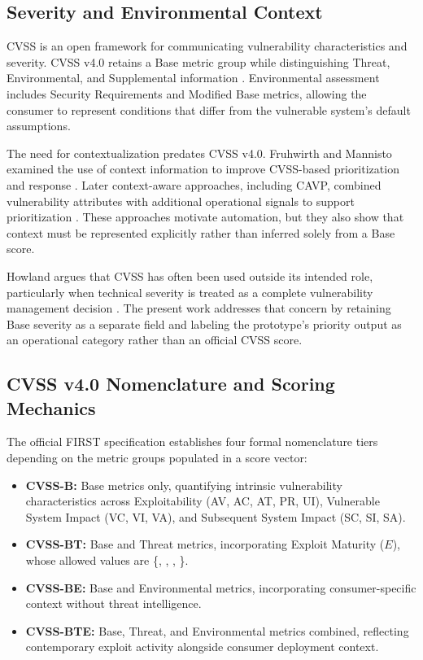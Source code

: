 \documentclass[conference]{IEEEtran}
\begin{document}
\subsection{Severity and Environmental Context}

CVSS is an open framework for communicating vulnerability characteristics and
severity. CVSS v4.0 retains a Base metric group while distinguishing Threat,
Environmental, and Supplemental information
\cite{first_spec,first_user_guide}. Environmental assessment includes Security
Requirements and Modified Base metrics, allowing the consumer to represent
conditions that differ from the vulnerable system's default assumptions.

The need for contextualization predates CVSS v4.0. Fruhwirth and Mannisto
examined the use of context information to improve CVSS-based prioritization
and response \cite{fruhwirth2009}. Later context-aware approaches, including
CAVP, combined vulnerability attributes with additional operational signals to
support prioritization \cite{jung2022cavp}. These approaches motivate
automation, but they also show that context must be represented explicitly
rather than inferred solely from a Base score.

Howland argues that CVSS has often been used outside its intended role,
particularly when technical severity is treated as a complete vulnerability
management decision \cite{howland2023}. The present work addresses that concern
by retaining Base severity as a separate field and labeling the prototype's
priority output as an operational category rather than an official CVSS score.

\subsection{CVSS v4.0 Nomenclature and Scoring Mechanics}

The official FIRST specification establishes four formal nomenclature tiers depending
on the metric groups populated in a score vector:
\begin{itemize}
\item \textbf{CVSS-B:} Base metrics only, quantifying intrinsic vulnerability characteristics across Exploitability (AV, AC, AT, PR, UI), Vulnerable System Impact (VC, VI, VA), and Subsequent System Impact (SC, SI, SA).
\item \textbf{CVSS-BT:} Base and Threat metrics, incorporating Exploit Maturity ($E$), whose allowed values are \{, , , \}.
\item \textbf{CVSS-BE:} Base and Environmental metrics, incorporating consumer-specific context without threat intelligence.
\item \textbf{CVSS-BTE:} Base, Threat, and Environmental metrics combined, reflecting contemporary exploit activity alongside consumer deployment context.
\end{itemize}
\end{document}
